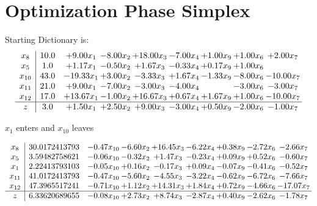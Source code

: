 \documentclass[9pt]{article}
\begin{document}
\section{Optimization Phase Simplex}
Starting Dictionary is:
\[\begin{array}{c| c c@{\hskip 2pt} c@{\hskip 2pt} c@{\hskip 2pt} c@{\hskip 2pt} c@{\hskip 2pt} c@{\hskip 2pt} c@{\hskip 2pt} }
 x_{8}   &  10.0 & +  9.00 x_{1} & -8.00 x_{2} & + 18.00 x_{3} & -7.00 x_{4} & +  1.00 x_{9} & +  1.00 x_{6} & +  2.00 x_{7}\\
 x_{5}   &  1.0 & +  1.17 x_{1} & -0.50 x_{2} & +  1.67 x_{3} & -0.33 x_{4} & +  0.17 x_{9} & +  1.00 x_{6} &   \\
 x_{10}   &  43.0 & -19.33 x_{1} & +  3.00 x_{2} & -3.33 x_{3} & +  1.67 x_{4} & -1.33 x_{9} & -8.00 x_{6} & -10.00 x_{7}\\
 x_{11}   &  21.0 & +  9.00 x_{1} & -7.00 x_{2} & -3.00 x_{3} & -4.00 x_{4} &   & -3.00 x_{6} & -3.00 x_{7}\\
 x_{12}   &  17.0 & + 13.67 x_{1} & -1.00 x_{2} & + 16.67 x_{3} & +  0.67 x_{4} & +  1.67 x_{9} & +  1.00 x_{6} & -10.00 x_{7}\\
\hline
z    &  3.0 & +  1.50 x_{1} & +  2.50 x_{2} & +  9.00 x_{3} & -3.00 x_{4} & +  0.50 x_{9} & -2.00 x_{6} & -1.00 x_{7}\\
\end{array}\]


 $ x_{1} $ enters and $ x_{10} $ leaves 

 \[\begin{array}{c| c c@{\hskip 2pt} c@{\hskip 2pt} c@{\hskip 2pt} c@{\hskip 2pt} c@{\hskip 2pt} c@{\hskip 2pt} c@{\hskip 2pt} }
 x_{8}   &  30.0172413793 & -0.47 x_{10} & -6.60 x_{2} & + 16.45 x_{3} & -6.22 x_{4} & +  0.38 x_{9} & -2.72 x_{6} & -2.66 x_{7}\\
 x_{5}   &  3.59482758621 & -0.06 x_{10} & -0.32 x_{2} & +  1.47 x_{3} & -0.23 x_{4} & +  0.09 x_{9} & +  0.52 x_{6} & -0.60 x_{7}\\
 x_{1}   &  2.22413793103 & -0.05 x_{10} & +  0.16 x_{2} & -0.17 x_{3} & +  0.09 x_{4} & -0.07 x_{9} & -0.41 x_{6} & -0.52 x_{7}\\
 x_{11}   &  41.0172413793 & -0.47 x_{10} & -5.60 x_{2} & -4.55 x_{3} & -3.22 x_{4} & -0.62 x_{9} & -6.72 x_{6} & -7.66 x_{7}\\
 x_{12}   &  47.3965517241 & -0.71 x_{10} & +  1.12 x_{2} & + 14.31 x_{3} & +  1.84 x_{4} & +  0.72 x_{9} & -4.66 x_{6} & -17.07 x_{7}\\
\hline
z    &  6.33620689655 & -0.08 x_{10} & +  2.73 x_{2} & +  8.74 x_{3} & -2.87 x_{4} & +  0.40 x_{9} & -2.62 x_{6} & -1.78 x_{7}\\
\end{array}\]
\end{document}
